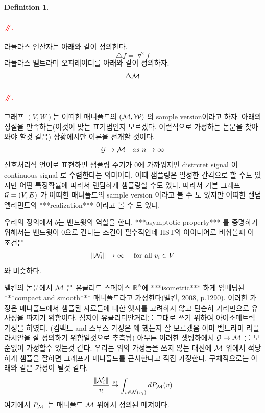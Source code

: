 \documentclass[preprint, review, 12pt]{article}
\theoremstyle{definition}
\newtheorem{dfn}{Definition}
\theoremstyle{remark}
\def\shrp{\paragraph{\textcolor{red}{\textit{\#.}}}}
\begin{document}
\begin{dfn}
\shrp 라플라스 연산자는 아래와 같이 정의한다. 
\[
\triangle f =\triangledown^2 f
\]
라플라스 벨트라미 오퍼레이터를 아래와 같이 정의하자. 
\[
\Delta {\cal M}
\]

\shrp 그래프 $(V,W)$는 어떠한 매니폴드의 $({\cal M},{\cal W})$ 의 sample version이라고 하자.  아래의 성질을 만족하는(이것이 맞는 표기법인지 모르겠다. 이런식으로 가정하는 논문을 찾아봐야 할것 같음) 상황에서만 이론을 전개할 것이다. 
\begin{align}
{\cal G} \to {\cal M} \quad as~ n\to \infty 
\end{align}
신호처리식 언어로 표현하면 샘플링 주기가 $0$에 가까워지면 distrcret signal 이 continuous signal 로 수렴한다는 의미이다. 이때 샘플링은 일정한 간격으로 할 수도 있지만 어떤 특정확률에 따라서 랜덤하게 샘플링할 수도 있다. 따라서 기븐 그래프 ${\cal G}=(V,E)$ 가 어떠한 매니폴드의 sample version 이라고 볼 수 도 있지만 어떠한 랜덤엘리먼트의 ***realization*** 이라고 볼 수 도 있다. 

우리의 정의에서 $b$는 밴드윗의 역할을 한다. ***asymptotic property*** 를 증명하기 위해서는 밴드윗이 0으로 간다는 조건이 필수적인데 HST의 아이디어로 비춰볼때 이 조건은 
\begin{align}
\|{\cal N}_ i\|\to \infty \quad \mbox{ for all } v_i \in V
\end{align}
와 비슷하다. 

벨킨의 논문에서 ${\cal M}$ 은 유클리드 스페이스 $\mathbb{R}^{N}$에 ***isometric*** 하게 임베딩된 ***compact and smooth*** 매니폴드라고 가정한다(벨킨, 2008, p.1290). 이러한 가정은 매니폴드에서 샘플된 자료들에 대한 엣지를 고려하지 않고 단순히 거리만으로 유사성을 따지기 위함이다. 심지어 유클리디안거리를 그대로 쓰기 위하여 아이소메트릭 가정을 하였다. (컴팩트 and 스무스 가정은 왜 했는지 잘 모르겠음 아마 벨트라미-라플라시안을 잘 정의하기 위함일것으로 추측됨) 아무튼 이러한 셋팅하에서 ${\cal G} \to {\cal M}$ 를 모순없이 가정할수 있는것 같다. 우리는 위의 가정들을 쓰지 않는 대신에 ${\cal M}$ 위에서 적당하게 샘플을 잘하면 그래프가 매니폴드를 근사한다고 직접 가정한다. 구체적으로는 아래와 같은 가정이 될것 같다. 
\begin{align}
\frac{\|{\cal N}_ i \|}{n} \overset{\operatorname{pr} }{\to} \int_{v \in {\cal N}(v_i)}dP_{\cal M}(v)
\end{align} 
여기에서 $P_{\cal M}$ 는 매니폴드 ${\cal M}$ 위에서 정의된 메져이다. 


\end{dfn}
\end{document}
